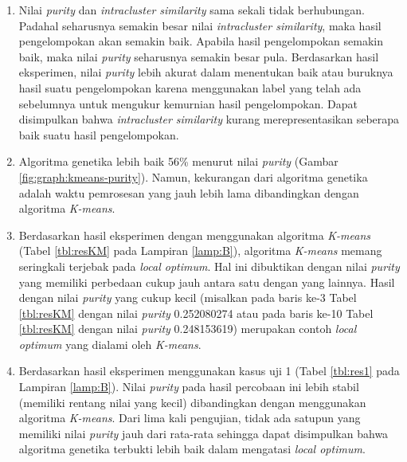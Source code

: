 \begin{enumerate}
	\item Nilai \textit{purity} dan \textit{intracluster similarity} sama sekali tidak berhubungan. Padahal seharusnya semakin besar nilai \textit{intracluster similarity}, maka hasil pengelompokan akan semakin baik. Apabila hasil pengelompokan semakin baik, maka nilai \textit{purity} seharusnya semakin besar pula. Berdasarkan hasil eksperimen, nilai \textit{purity} lebih akurat dalam menentukan baik atau buruknya hasil suatu pengelompokan karena menggunakan label yang telah ada sebelumnya untuk mengukur kemurnian hasil pengelompokan. Dapat disimpulkan bahwa \textit{intracluster similarity} kurang merepresentasikan seberapa baik suatu hasil pengelompokan.
	\item Algoritma genetika lebih baik 56\% menurut nilai \textit{purity} (Gambar \ref{fig:graph:kmeans-purity}). Namun, kekurangan dari algoritma genetika adalah waktu pemrosesan yang jauh lebih lama dibandingkan dengan algoritma \textit{K-means}. 
	\item Berdasarkan hasil eksperimen dengan menggunakan algoritma \textit{K-means} (Tabel \ref{tbl:resKM} pada Lampiran \ref{lamp:B}), algoritma \textit{K-means} memang seringkali terjebak pada \textit{local optimum}. Hal ini dibuktikan dengan nilai \textit{purity} yang memiliki perbedaan cukup jauh antara satu dengan yang lainnya. Hasil dengan nilai \textit{purity} yang cukup kecil (misalkan pada baris ke-3 Tabel \ref{tbl:resKM} dengan nilai \textit{purity} 0.252080274 atau pada baris ke-10 Tabel \ref{tbl:resKM} dengan nilai \textit{purity} 0.248153619) merupakan contoh \textit{local optimum} yang dialami oleh \textit{K-means}.
	\item Berdasarkan hasil eksperimen menggunakan kasus uji 1 (Tabel \ref{tbl:res1} pada Lampiran \ref{lamp:B}). Nilai \textit{purity} pada hasil percobaan ini lebih stabil (memiliki rentang nilai yang kecil) dibandingkan dengan menggunakan algoritma \textit{K-means}. Dari lima kali pengujian, tidak ada satupun yang memiliki nilai \textit{purity} jauh dari rata-rata sehingga dapat disimpulkan bahwa algoritma genetika terbukti lebih baik dalam mengatasi \textit{local optimum}.
\end{enumerate}